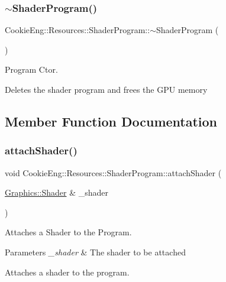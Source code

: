 \subsubsection{\texorpdfstring{$\sim$\+Shader\+Program()}{~ShaderProgram()}}
{\footnotesize\ttfamily Cookie\+Eng\+::\+Resources\+::\+Shader\+Program\+::$\sim$\+Shader\+Program (\begin{DoxyParamCaption}{ }\end{DoxyParamCaption})\hspace{0.3cm}{\ttfamily [inline]}}



Program Ctor. 

Deletes the shader program and frees the G\+PU memory 

\subsection{Member Function Documentation}
\mbox{\label{class_cookie_eng_1_1_resources_1_1_shader_program_a951108feded567e573928dbb1d8caeca}} 
\subsubsection{\texorpdfstring{attach\+Shader()}{attachShader()}}
{\footnotesize\ttfamily void Cookie\+Eng\+::\+Resources\+::\+Shader\+Program\+::attach\+Shader (\begin{DoxyParamCaption}\item[{\hyperlink{class_cookie_eng_1_1_graphics_1_1_shader}{Graphics\+::\+Shader} \&}]{\+\_\+shader }\end{DoxyParamCaption})}



Attaches a Shader to the Program. 


\begin{DoxyParams}{Parameters}
{\em \+\_\+shader} & The shader to be attached\\
\hline
\end{DoxyParams}
Attaches a shader to the program. \mbox{\label{class_cookie_eng_1_1_resources_1_1_shader_program_a4824333f2e0ee0e7cfc91cb0de92e065}} 
